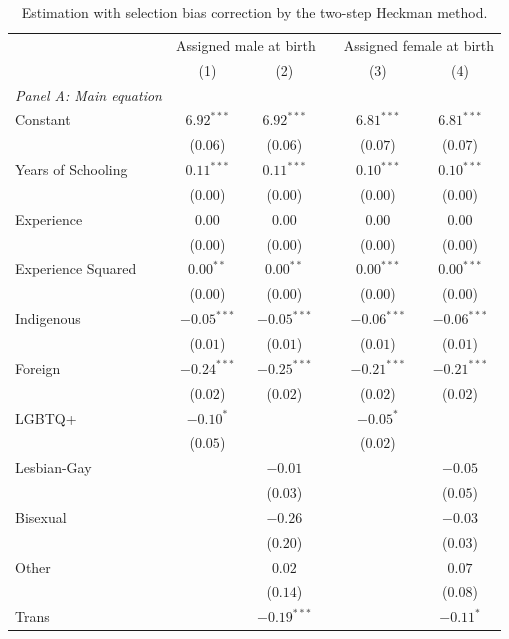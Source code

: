\begin{table}[H]
\begin{center}
\begin{threeparttable}
\captionsetup{margin=0.5cm}
\caption{Estimation with selection bias correction by the two-step Heckman method.}
\label{AT1_panelA}
\footnotesize
\centering
\begin{tabular}{lccccc}
\toprule
 & \multicolumn{2}{c}{Assigned male at birth} & & \multicolumn{2}{c}{Assigned female at birth} \\ 
 & (1) & (2) & & (3) & (4) \\ \midrule
\textit{Panel A: Main equation} &  & &  &  &  \\ 
Constant & $6.92^{***}$& $6.92^{***}$ & & $6.81^{***}$& $6.81^{***}$ \\ 
 & ($0.06$)& ($0.06$) & & ($0.07$)& ($0.07$) \\ 
Years of Schooling & $0.11^{***}$& $0.11^{***}$ & & $0.10^{***}$& $0.10^{***}$ \\ 
 & ($0.00$)& ($0.00$) & & ($0.00$)& ($0.00$) \\ 
Experience & $0.00$& $0.00$ & & $0.00$& $0.00$ \\ 
 & ($0.00$)& ($0.00$) & & ($0.00$)& ($0.00$) \\ 
Experience Squared & $0.00^{**}$& $0.00^{**}$ & & $0.00^{***}$& $0.00^{***}$ \\ 
 & ($0.00$)& ($0.00$) & & ($0.00$)& ($0.00$) \\ 
Indigenous & $-0.05^{***}$& $-0.05^{***}$ & & $-0.06^{***}$& $-0.06^{***}$ \\ 
 & ($0.01$)& ($0.01$) & & ($0.01$)& ($0.01$) \\ 
Foreign & $-0.24^{***}$& $-0.25^{***}$ & & $-0.21^{***}$& $-0.21^{***}$ \\ 
 & ($0.02$)& ($0.02$) & & ($0.02$)& ($0.02$) \\ 
LGBTQ+ & $-0.10^{*}$&  & & $-0.05^{*}$&  \\ 
 & ($0.05$)&  & & ($0.02$)&  \\ 
Lesbian-Gay & & $-0.01$ & & & $-0.05$ \\ 
 & & ($0.03$) & & & ($0.05$) \\ 
Bisexual & & $-0.26$ & & & $-0.03$ \\ 
 & & ($0.20$) & & & ($0.03$) \\ 
Other & & $0.02$ & & & $0.07$ \\ 
 & & ($0.14$) & & & ($0.08$) \\ 
Trans & & $-0.19^{***}$ & & & $-0.11^{*}$ \\ 

\end{tabular}
\end{threeparttable}
\end{center}
\end{table}
